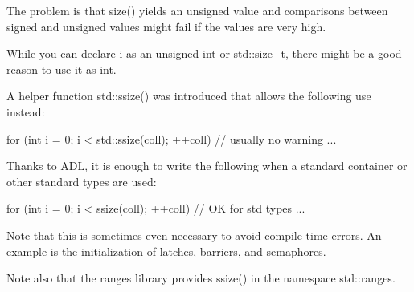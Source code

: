 The problem is that size() yields an unsigned value and comparisons between signed and unsigned values might fail if the values are very high.

While you can declare i as an unsigned int or std::size\_t, there might be a good reason to use it as int.

A helper function std::ssize() was introduced that allows the following use instead:

\begin{cpp}
for (int i = 0; i < std::ssize(coll); ++coll) { // usually no warning
	...
}
\end{cpp}

Thanks to ADL, it is enough to write the following when a standard container or other standard types are used:

\begin{cpp}
for (int i = 0; i < ssize(coll); ++coll) { // OK for std types
	...
}
\end{cpp}

Note that this is sometimes even necessary to avoid compile-time errors. An example is the initialization of latches, barriers, and semaphores.

Note also that the ranges library provides ssize() in the namespace std::ranges.















